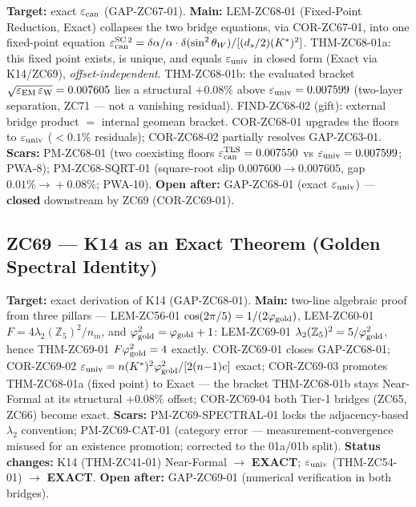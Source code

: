 \documentclass[11pt, a4paper]{article}
\newcommand{\swsq}{\sin^2\theta_W}
\newcommand{\Zfi}{\mathbb{Z}_5}
\newcommand{\epscan}{\varepsilon_{\rm can}}
\newcommand{\epsEM}{\varepsilon_{\rm EM}}
\newcommand{\phig}{\varphi_{\rm gold}}
\newcommand{\Kstar}{K^*}
\begin{document}
\begin{zcbox}[title={ZC68: THM-ZC68-01a/b --- Bridge Fixed Point \& Bracket (v2)}]
\sloppy
\textbf{Target:} exact $\epscan$ (GAP-ZC67-01). \textbf{Main:} LEM-ZC68-01
(Fixed-Point Reduction, Exact) collapses the two bridge equations, via
COR-ZC67-01, into one fixed-point equation
$\varepsilon_{\rm can}^{\rm SC\,2}=\delta\alpha/\alpha\cdot\delta(\swsq)/[(d_s/2)(\Kstar)^2]$.
THM-ZC68-01a: this fixed point exists, is unique, and equals $\varepsilon_{\rm univ}$
in closed form (Exact via K14/ZC69), \emph{offset-independent}. THM-ZC68-01b: the
evaluated bracket $\sqrt{\epsEM\,\varepsilon_{\rm W}}=0.007605$ lies a structural
$+0.08\%$ above $\varepsilon_{\rm univ}=0.007599$ (two-layer separation, ZC71 ---
not a vanishing residual). FIND-ZC68-02 (gift): external bridge product $=$ internal
geomean bracket. COR-ZC68-01 upgrades the floors to $\varepsilon_{\rm univ}$
($<0.1\%$ residuals); COR-ZC68-02 partially resolves GAP-ZC63-01.
\textbf{Scars:} PM-ZC68-01 (two coexisting floors
$\varepsilon_{\rm can}^{\rm TLS}=0.007550$ vs $\varepsilon_{\rm univ}=0.007599$; PWA-8);
PM-ZC68-SQRT-01 (square-root slip $0.007600\!\to\!0.007605$, gap
$0.01\%\!\to\!+0.08\%$; PWA-10).
\textbf{Open after:} GAP-ZC68-01 (exact $\varepsilon_{\rm univ}$) ---
\textbf{closed} downstream by ZC69 (COR-ZC69-01).
\end{zcbox}

\subsection{ZC69 --- K14 as an Exact Theorem (Golden Spectral Identity)}

\begin{zcbox}[title={ZC69: THM-ZC69-01 --- $F\phig^2=4$ EXACT}]
\sloppy
\textbf{Target:} exact derivation of K14 (GAP-ZC68-01). \textbf{Main:}
two-line algebraic proof from three pillars --- LEM-ZC56-01
$\cos(2\pi/5)=1/(2\phig)$, LEM-ZC60-01 $F=4\lambda_2(\Zfi)^2/n_m$, and
$\phig^2=\phig+1$: LEM-ZC69-01 $\lambda_2(\Zfi)^2=5/\phig^2$, hence
THM-ZC69-01 $F\phig^2=4$ exactly. COR-ZC69-01 closes GAP-ZC68-01;
COR-ZC69-02 $\varepsilon_{\rm univ}=n(\Kstar)^2\phig^2/[2(n{-}1)e]$ exact;
COR-ZC69-03 promotes THM-ZC68-01a (fixed point) to Exact --- the bracket
THM-ZC68-01b stays Near-Formal at its structural $+0.08\%$ offset;
COR-ZC69-04 both Tier-1 bridges (ZC65, ZC66) become exact.
\textbf{Scars:} PM-ZC69-SPECTRAL-01 locks the adjacency-based $\lambda_2$
convention; PM-ZC69-CAT-01 (category error --- measurement-convergence misused
for an existence promotion; corrected to the 01a/01b split).
\textbf{Status changes:} K14 (THM-ZC41-01) Near-Formal $\to$ \textbf{EXACT};
$\varepsilon_{\rm univ}$ (THM-ZC54-01) $\to$ \textbf{EXACT}.
\textbf{Open after:} GAP-ZC69-01 (numerical verification in both bridges).
\end{zcbox}
\end{document}
